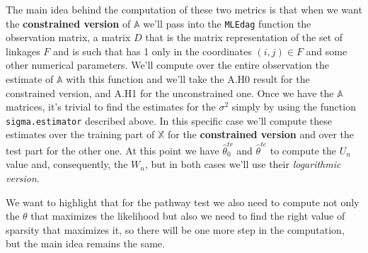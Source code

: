 \documentclass[
]{article}
\begin{document}
The main idea behind the computation of these two metrics is that when
we want the \textbf{constrained version} of \(\mathbb{A}\) we'll pass
into the \texttt{MLEdag} function the observation matrix, a matrix \(D\)
that is the matrix representation of the set of linkages \(F\) and is
such that has 1 only in the coordinates \((i, j) \in F\) and some other
numerical parameters. We'll compute over the entire observation the
estimate of \(\mathbb{A}\) with this function and we'll take the A.H0
result for the constrained version, and A.H1 for the unconstrained one.
Once we have the \(\mathbb{A}\) matrices, it's trivial to find the
estimates for the \(\sigma^2\) simply by using the function
\texttt{sigma.estimator} described above. In this specific case we'll
compute these estimates over the training part of \(\mathbb{X}\) for the
\textbf{constrained version} and over the test part for the other one.
At this point we have \(\hat{\theta}_0^{tr}\) and \(\hat{\theta}^{te}\)
to compute the \(U_n\) value and, consequently, the \(W_n\), but in both
cases we'll use their \emph{logarithmic version}.

We want to highlight that for the pathway test we also need to compute
not only the \(\theta\) that maximizes the likelihood but also we need
to find the right value of sparsity that maximizes it, so there will be
one more step in the computation, but the main idea remains the same.
\end{document}
